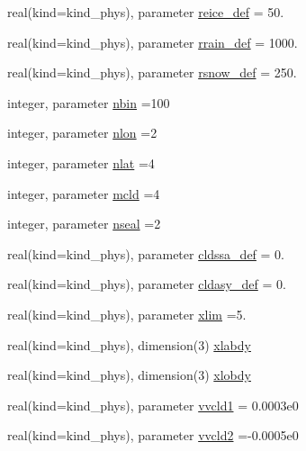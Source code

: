 \begin{DoxyCompactItemize}
\item 
real(kind=kind\+\_\+phys), parameter \hyperlink{namespacemodule__radiation__clouds_a721e0fb4a34774f5b61f567b9cad8e7b}{reice\+\_\+def} = 50.
\item 
real(kind=kind\+\_\+phys), parameter \hyperlink{namespacemodule__radiation__clouds_a93fcaedae02c0f9c4de9f39061379d6b}{rrain\+\_\+def} = 1000.
\item 
real(kind=kind\+\_\+phys), parameter \hyperlink{namespacemodule__radiation__clouds_a2b68c4a206e17cb59597f6c4dffc7c1a}{rsnow\+\_\+def} = 250.
\item 
integer, parameter \hyperlink{namespacemodule__radiation__clouds_ad2947b3c0a8382fbe12b76dd68b290e0}{nbin} =100
\item 
integer, parameter \hyperlink{namespacemodule__radiation__clouds_ab4d14edea12bbcda5361cad523386c7c}{nlon} =2
\item 
integer, parameter \hyperlink{namespacemodule__radiation__clouds_ad4274cb223949e858ecc2e6346bed610}{nlat} =4
\item 
integer, parameter \hyperlink{namespacemodule__radiation__clouds_afb94f3d62afa49bef6c33f73a7ecad65}{mcld} =4
\item 
integer, parameter \hyperlink{namespacemodule__radiation__clouds_aaf2a6549a8c42b9eae3d40d21d1e9532}{nseal} =2
\item 
real(kind=kind\+\_\+phys), parameter \hyperlink{namespacemodule__radiation__clouds_a2ce850be46f0144caa09309ae01958c2}{cldssa\+\_\+def} = 0.
\item 
real(kind=kind\+\_\+phys), parameter \hyperlink{namespacemodule__radiation__clouds_ab94e45a81d8be82b6cb686b35fd78a80}{cldasy\+\_\+def} = 0.
\item 
real(kind=kind\+\_\+phys), parameter \hyperlink{namespacemodule__radiation__clouds_a1146f43b680b655d354a9c031ee4a463}{xlim} =5.
\item 
real(kind=kind\+\_\+phys), dimension(3) \hyperlink{namespacemodule__radiation__clouds_ab2a798da0bb0125d1d5074b73c5951dc}{xlabdy}
\item 
real(kind=kind\+\_\+phys), dimension(3) \hyperlink{namespacemodule__radiation__clouds_aab28f783919380e5ff7f925f70355a57}{xlobdy}
\item 
real(kind=kind\+\_\+phys), parameter \hyperlink{namespacemodule__radiation__clouds_a6ec3c0444de53580befd4bb4d39844d3}{vvcld1} = 0.\+0003e0
\item 
real(kind=kind\+\_\+phys), parameter \hyperlink{namespacemodule__radiation__clouds_a67962e77fb073cc25cafaaba0c2fa833}{vvcld2} =-\/0.\+0005e0

\end{DoxyCompactItemize}
